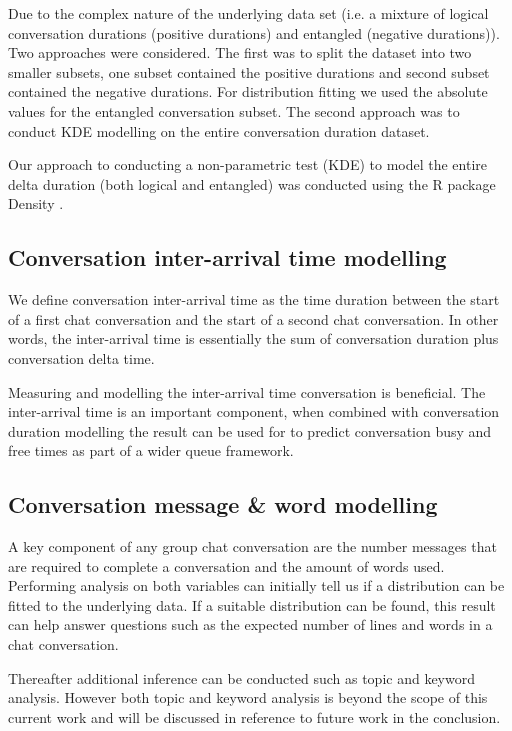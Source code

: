 Due to the complex nature of the underlying data set (i.e. a mixture of logical conversation durations (positive durations) and entangled (negative durations)). Two approaches were considered. The first was to split the dataset into two smaller subsets, one subset contained the positive durations and second subset contained the negative durations. For distribution fitting we used the absolute values for the entangled conversation subset. The second approach was to conduct KDE modelling on the entire conversation duration dataset. 

Our approach to conducting a non-parametric test (KDE) to model the entire delta duration (both logical and entangled) was conducted using the R package Density \cite{Rdensity}. 

\subsection{Conversation inter-arrival time modelling}

We define conversation inter-arrival time as the time duration between the start of a first chat conversation and the start of a second chat conversation. In other words, the inter-arrival time is essentially the sum of conversation duration plus conversation delta time.  

Measuring and modelling the inter-arrival time conversation is beneficial.  The inter-arrival time is an important component, when combined with conversation duration modelling the result can be used for to predict conversation busy and free times as part of a wider queue framework.

\subsection{Conversation message \& word modelling}

A key component of any group chat conversation are the number messages that are required to complete a conversation and the amount of words used. Performing analysis on both variables can initially tell us if a distribution can be fitted to the underlying data. If a suitable distribution can be found, this result can help answer questions such as the expected number of lines and words in a chat conversation.

Thereafter additional inference can be conducted such as topic and keyword analysis. However both topic and keyword analysis is beyond the scope of this current work and will be discussed in reference to future work in the conclusion.

